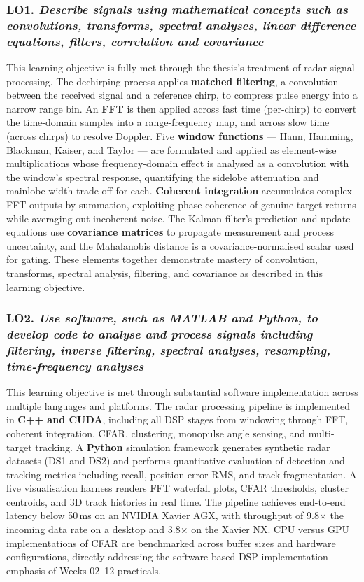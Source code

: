 \subsubsection*{LO1. \emph{Describe signals using mathematical concepts such as
convolutions, transforms, spectral analyses, linear difference equations, filters,
correlation and covariance}}
This learning objective is fully met through the thesis's treatment of radar signal
processing. The dechirping process applies \textbf{matched filtering}, a convolution
between the received signal and a reference chirp, to compress pulse energy into a
narrow range bin. An \textbf{FFT} is then applied across fast time (per-chirp) to
convert the time-domain samples into a range-frequency map, and across slow time
(across chirps) to resolve Doppler. Five \textbf{window functions} --- Hann, Hamming,
Blackman, Kaiser, and Taylor --- are formulated and applied as element-wise
multiplications whose frequency-domain effect is analysed as a convolution with the
window's spectral response, quantifying the sidelobe attenuation and mainlobe width
trade-off for each. \textbf{Coherent integration} accumulates complex FFT outputs by
summation, exploiting phase coherence of genuine target returns while averaging out
incoherent noise. The Kalman filter's prediction and update equations use \textbf{covariance
matrices} to propagate measurement and process uncertainty, and the Mahalanobis
distance is a covariance-normalised scalar used for gating. These elements together
demonstrate mastery of convolution, transforms, spectral analysis, filtering, and
covariance as described in this learning objective.

\subsubsection*{LO2. \emph{Use software, such as MATLAB and Python, to develop code to
analyse and process signals including filtering, inverse filtering, spectral analyses,
resampling, time-frequency analyses}}
This learning objective is met through substantial software implementation across
multiple languages and platforms. The radar processing pipeline is implemented in
\textbf{C++ and CUDA}, including all DSP stages from windowing through FFT, coherent
integration, CFAR, clustering, monopulse angle sensing, and multi-target tracking.
A \textbf{Python} simulation framework generates synthetic radar datasets (DS1 and DS2)
and performs quantitative evaluation of detection and tracking metrics including recall,
position error RMS, and track fragmentation. A live visualisation harness renders FFT
waterfall plots, CFAR thresholds, cluster centroids, and 3D track histories in real
time. The pipeline achieves end-to-end latency below 50\,ms on an NVIDIA Xavier AGX,
with throughput of 9.8$\times$ the incoming data rate on a desktop and 3.8$\times$ on
the Xavier NX. CPU versus GPU implementations of CFAR are benchmarked across buffer
sizes and hardware configurations, directly addressing the software-based DSP
implementation emphasis of Weeks 02--12 practicals.

